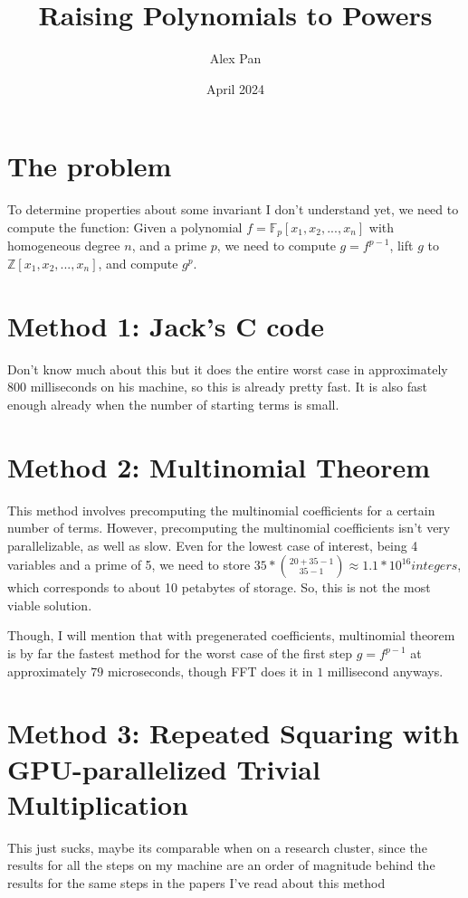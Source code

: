 \documentclass{article}
\title{Raising Polynomials to Powers}
\author{Alex Pan}
\date{April 2024}
\begin{document}
\maketitle

\section*{The problem}
To determine properties about some invariant I don't understand yet, we need to compute the function: Given a polynomial $f = \mathbb{F}_{p}[x_1, x_2, ... , x_n]$ with homogeneous degree $n$, and a prime $p$, we need to compute $g = f^{p-1}$, lift $g$ to $\mathbb{Z}[x_1, x_2, ... , x_n]$, and compute $g^{p}$. 

\section*{Method 1: Jack's C code}
Don't know much about this but it does the entire worst case in approximately $800$ milliseconds on his machine, so this is already pretty fast. It is also fast enough already when the number of starting terms is small.

\section*{Method 2: Multinomial Theorem}
This method involves precomputing the multinomial coefficients for a certain number of terms. However, precomputing the multinomial coefficients isn't very parallelizable, as well as slow. Even for the lowest case of interest, being 4 variables and a prime of 5, we need to store $35 * \binom{20 + 35 - 1}{35 - 1} \approx 1.1 * 10^16 integers$, which corresponds to about 10 petabytes of storage. So, this is not the most viable solution.

Though, I will mention that with pregenerated coefficients, multinomial theorem is by far the fastest method for the worst case of the first step $g = f^{p - 1}$ at approximately $79$ microseconds, though FFT does it in $1$ millisecond anyways.

\section*{Method 3: Repeated Squaring with GPU-parallelized Trivial Multiplication}
This just sucks, maybe its comparable when on a research cluster, since the results for all the steps on my machine are an order of magnitude behind the results for the same steps in the papers I've read about this method
\end{document}
